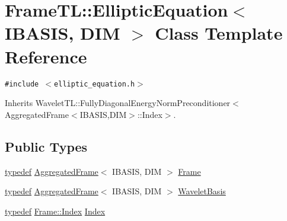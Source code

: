 \hypertarget{classFrameTL_1_1EllipticEquation}{
\section{FrameTL::EllipticEquation$<$ IBASIS, DIM $>$ Class Template Reference}
\label{classFrameTL_1_1EllipticEquation}
}
{\tt \#include $<$elliptic\_\-equation.h$>$}

Inherits WaveletTL::FullyDiagonalEnergyNormPreconditioner$<$AggregatedFrame$<$IBASIS,DIM$>$::Index$>$.

\subsection*{Public Types}
\begin{CompactItemize}
\item 
\hyperlink{structtypedef}{typedef} \hyperlink{classFrameTL_1_1AggregatedFrame}{AggregatedFrame}$<$ IBASIS, DIM $>$ \hyperlink{classFrameTL_1_1EllipticEquation_65fa5216492c8a03f841cf910182a00c}{Frame}
\item 
\hyperlink{structtypedef}{typedef} \hyperlink{classFrameTL_1_1AggregatedFrame}{AggregatedFrame}$<$ IBASIS, DIM $>$ \hyperlink{classFrameTL_1_1EllipticEquation_44b9abebf9c101271d3ddec1ce3ffd3a}{WaveletBasis}
\item 
\hyperlink{structtypedef}{typedef} \hyperlink{classFrameTL_1_1FrameIndex}{Frame::Index} \hyperlink{classFrameTL_1_1EllipticEquation_598c5b4d850e49947abc0a253298e94c}{Index}
\end{CompactItemize}
